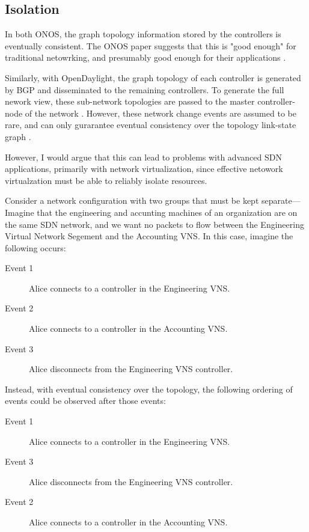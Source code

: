 \documentclass[letterpaper,twocolumn,10pt]{article}
\begin{document}
\subsection{Isolation}

In both ONOS, the graph topology information stored by the controllers is eventually consistent. The ONOS paper suggests that this is "good enough" for traditional netowrking, and presumably good enough for their applications \cite{berde2014onos}. 

Similarly, with OpenDaylight, the graph topology of each controller is generated by BGP and disseminated to the remaining controllers. To generate the full nework view, these sub-network topologies are passed to the master controller-node of the network \cite{ONV:wiki}. However, these network change events are assumed to be rare, and can only gurarantee eventual consistency over the topology link-state graph \cite{bgp:rfc}.

However, I would argue that this can lead to problems with advanced SDN applications, primarily with network virtualization, since effective netowork virtualzation must be able to reliably isolate resources.

Consider a network configuration with two groups that must be kept separate---Imagine that the engineering and accunting machines of an organization are on the same SDN network, and we want no packets to flow between the Engineering Virtual Network Segement and the Accounting VNS. In this case, imagine the following occurs:

\begin{description}
\item [Event 1] Alice connects to a controller in the Engineering VNS.
\item [Event 2] Alice connects to a controller in the Accounting VNS.
\item [Event 3] Alice disconnects from  the Engineering VNS controller.
\end{description}

Instead, with eventual consistency over the topology, the following ordering of events could be observed after those events:

\begin{description}
\item [Event 1] Alice connects to a controller in the Engineering VNS.
\item [Event 3] Alice disconnects from the Engineering VNS controller.
\item [Event 2] Alice connects to a controller in the Accounting VNS.
\end{description}
\end{document}
